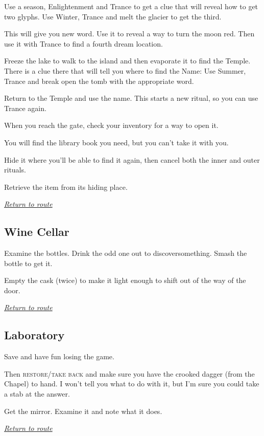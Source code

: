 \documentclass[a5paper]{extarticle}
\begin{document}
Use a season, Enlightenment and Trance to get a clue that will reveal how to get two glyphs.
Use Winter, Trance and melt the glacier to get the third.

This will give you new word. Use it to reveal a way to turn the moon red.
Then use it with Trance to find a fourth dream location.

Freeze the lake to walk to the island and then evaporate it to find the Temple.
There is a clue there that will tell you where to find the Name:
Use Summer, Trance and break open the tomb with the appropriate word.

Return to the Temple and use the name.
This starts a new ritual, so you can use Trance again.

When you reach the gate, check your inventory for a way to open it.

You will find the library book you need, but you can't take it with you.

Hide it where you'll be able to find it again,
then cancel both the inner and outer rituals.

Retrieve the item from its hiding place.

\hyperref[sec:route-8]{\emph{Return to route}}

\newpage
\subsection{Wine Cellar}\label{sec:sol-Wine-Cellar}

Examine the bottles. Drink the odd one out to discover\xelip something.
Smash the bottle to get it.

Empty the cask (twice) to make it light enough to shift out of the way of the door.

\hyperref[sec:route-8]{\emph{Return to route}}

\newpage
\subsection{Laboratory}\label{sec:sol-Laboratory}

Save and have fun losing the game.

Then \textsc{restore}\slash \textsc{take back} and make sure you have the
crooked dagger (from the Chapel) to hand.
I won't tell you what to do with it,
but I'm sure you could take a stab at the answer.

Get the mirror. Examine it and note what it does.

\hyperref[sec:route-8]{\emph{Return to route}}
\end{document}
